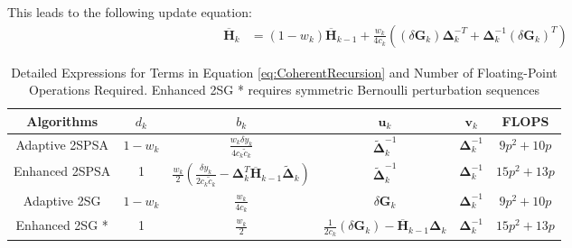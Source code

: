 \documentclass[conference]{IEEEtran}
\newcommand{\bG}{\bm{G}}
\newcommand{\bDelta}{\bm{\Delta}}
\newcommand{\oH}{\bm{\overline{H}}}
\newcommand{\tDelta}{\bm{\tilde{\Delta}}}
\newcommand{\remove}[1]{}
\begin{document}
This leads to the following update equation:
\begin{align*}
\oH_k
&= (1 - w_k) \oH_{k-1} + \frac{w_k}{4c_k} ((\delta\bG_k)\bDelta_k^{-T}+\bDelta_k^{-1}(\delta\bG_k)^{T})
\end{align*}
\remove{
Above gives a rank-2 update from $ \oH_{k-1}^{-1} $ to $ \oH_{k}^{-1} $. Write the sequential recursion of the $ \oH_k^{-1} $ as following:
\begin{equation} \label{eq:2SGSequentialUpdate}
\begin{dcases}
\bm{B}_k^{-1}
&=\frac{k+1}{k}\oH_{k-1}^{-1}-(\frac{k+1}{k})^2\oH_{k-1}^{-1}(\delta\bG_k)\\
&~~~\cdot(b_k^{-1}+\frac{k+1}{k}\bDelta_k^{-T}\oH_{k-1}^{-1}(\delta\bG_k)\bDelta_k^{-T}\oH_{k-1}^{-1}\\
\oH_k^{-1}
&=\bm{B}_k^{-1}-\bm{B}_k^{-1}\bDelta_k^{-1}\\
&~~~\cdot(b_k^{-1}+(\delta\bG_k)^{T}\bm{B}_k^{-1}\bDelta_k^{-1})^{-1}(\delta\bG_k)^{T}\bm{B}_k^{-1}
\end{dcases}
\end{equation}
where
\begin{equation}\label{eq:2SGB}
\bm{B}_k=\frac{k}{k+1}\oH_{k-1}+b_k(\delta\bG_k)\bDelta_k^{-T}
\end{equation}
Now we analyze the FLOPs of the sequential update \ref{eq:2SGSequentialUpdate}, compared with the original algorithm \ref{eq:Adaptation}:
}

\begin{table*}
	\centering
	\resizebox{1.95\columnwidth}{!}
	{
		\begin{tabular}{|c | c | c | c | c| c |}
			\hline
			Algorithms & $d_k$ & $b_k$ & $\bm{u}_k$ & $\bm{v}_k$ & FLOPS \\
			\hline
			Adaptive 2SPSA  & $1-w_k$ & $\frac{w_k \delta y_k}{4c_k\tilde{c}_k}$ & $\tDelta_k^{-1}$ & $\bDelta_k^{-1}$ & $9p^2+10p$\\
			Enhanced 2SPSA & 1 & $\frac{w_k}{2}(\frac{\delta y_k}{2c_k\tilde{c}_k}-\bDelta_k^{T}\oH_{k-1}\tDelta_k)$ & $\tDelta_k^{-1}$  & $\bDelta_k^{-1}$  & $15p^2 + 13p$\\
			Adaptive 2SG & $1-w_k$ & $\frac{w_k}{4c_k}$ & $\delta\bG_k$ & $\bDelta_k^{-1}$  & $9p^2 + 10p$\\
			Enhanced 2SG * & 1 & $\frac{w_k}{2}$ & $\frac{1}{2c_k}(\delta\bG_k) - \oH_{k-1}\bDelta_k $ & $\bDelta_k^{-1}$  & $15p^2 + 13p$\\
			\hline
		\end{tabular}

	}
	\\[5pt]
	\caption{Detailed Expressions for Terms in Equation \ref{eq:CoherentRecursion} and Number of Floating-Point Operations Required.
	\newline
	{\scriptsize Enhanced 2SG * requires symmetric Bernoulli perturbation sequences} }  \label{tab:Summary}
\end{table*}
\end{document}
